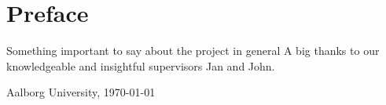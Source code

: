 \thispagestyle{empty}
\chapter*{Preface}\label{ch:preface}

Something important to say about the project in general
A big thanks to our knowledgeable and insightful supervisors Jan and John.

\vspace{\baselineskip}\hfill Aalborg University, \today







